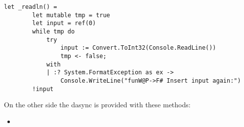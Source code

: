 \begin{lstlisting}[caption=All \fwap \texttt{readln()}'s are compiled into \fsharps \texttt{\_readln()}'s.]
let _readln() =
        let mutable tmp = true
        let input = ref(0)
        while tmp do
            try
                input := Convert.ToInt32(Console.ReadLine())
                tmp <- false;
            with
            | :? System.FormatException as ex ->
                Console.WriteLine("funW@P->F# Insert input again:")
        !input
\end{lstlisting}

On the other side the dasync is provided with these methods:
\begin{itemize}
	\item 
\end{itemize}
 


